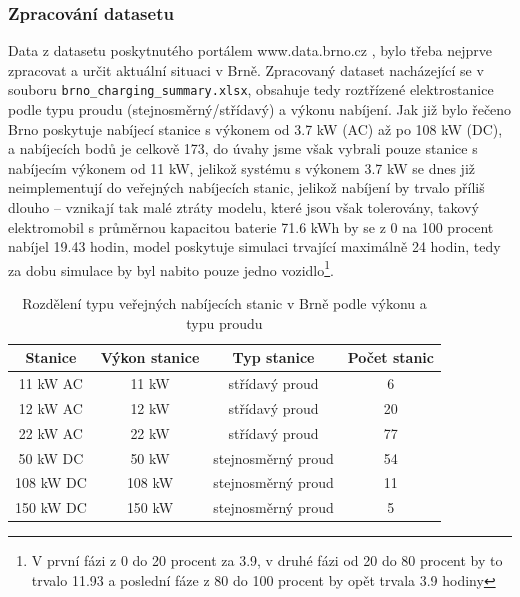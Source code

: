 \documentclass[a4paper,11pt]{article}
\begin{document}
\subsubsection{Zpracování datasetu}
\label{dataset-processing}
Data z datasetu poskytnutého portálem www.data.brno.cz \cite{data_brno}, bylo třeba nejprve zpracovat a určit 
aktuální situaci v Brně. Zpracovaný dataset nacházející se v souboru \texttt{brno\_charging\_summary.xlsx},
obsahuje tedy roztřízené elektrostanice podle typu proudu (stejnosměrný/střídavý) a výkonu nabíjení. Jak již bylo
řečeno Brno poskytuje nabíjecí stanice s výkonem od 3.7 kW (AC) až po 108 kW (DC), a nabíjecích bodů je celkově 173,
do úvahy jsme však vybrali pouze stanice s nabíjecím výkonem od 11 kW, jelikož systému s výkonem 3.7 kW se dnes již 
neimplementují do veřejných nabíjecích stanic, jelikož nabíjení by trvalo příliš dlouho -- vznikají tak malé ztráty
modelu, které jsou však tolerovány, takový elektromobil s průměrnou kapacitou baterie 71.6 kWh by se z 0 na 100 procent 
nabíjel 19.43 hodin, model poskytuje simulaci trvající maximálně 24 hodin, tedy za dobu simulace by byl nabito pouze jedno
vozidlo\footnote{V první fázi z 0 do 20 procent za 3.9, v druhé fázi od 20 do 80 procent by to trvalo 11.93 a poslední 
fáze z 80 do 100 procent by opět trvala 3.9 hodiny}.

\begin{table}[h!]
    \centering
    \vspace{0.5cm} %
    \begin{tabular}{|c|c|c|c|}
        \hline
        \textbf{Stanice} & \textbf{Výkon stanice} & \textbf{Typ stanice} & \textbf{Počet stanic}\\
        \hline
        11 kW  AC &  11 kW   & střídavý proud       & 6  \\
        \hline
        12 kW  AC &  12 kW   & střídavý proud       & 20  \\
        \hline
        22 kW  AC &  22 kW   & střídavý proud       & 77  \\
        \hline
        50 kW  DC &  50 kW   & stejnosměrný proud   & 54  \\
        \hline
        108 kW DC &  108 kW  & stejnosměrný proud   & 11  \\
        \hline
        150 kW DC &  150 kW  & stejnosměrný proud   & 5  \\
        \hline
    \end{tabular}
    \caption{Rozdělení typu veřejných nabíjecích stanic v Brně podle výkonu a typu proudu}
    \label{table:charging-stations-distribution}
    \vspace{0.5cm} %
\end{table}
\end{document}
